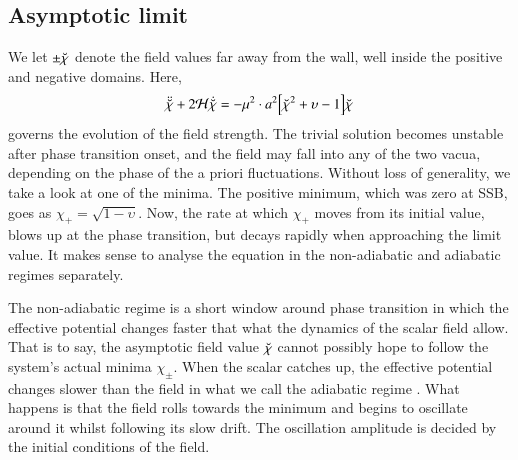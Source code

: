 \subsection{Asymptotic limit}\label{sec:PT:symm_dws:asymptotic}
    We let $\pm\breve{\chi}$ denote the field values far away from the wall, well inside the positive and negative domains. Here,
    \begin{equation}\label{eq:PT:symm_dws:eom_asym_chi_s}
        \ddot{\breve{\chi}} +  2\mathcal{H} \dot{\breve{\chi}} = - \mu^2 \cdot a^2{\left[  \breve{\chi}^2 + \upsilon - 1  \right]}\breve{\chi}
    \end{equation}
    governs the evolution of the field strength. The trivial solution becomes unstable after phase transition onset, and the field may fall into any of the two vacua, depending on the phase of the a priori fluctuations. Without loss of generality, we take a look at one of the minima. The positive minimum, which was zero at SSB, goes as $\chi_+ = \sqrt{1-\upsilon}$. Now, the rate at which $\chi_+$ moves from its initial value, blows up at the phase transition, but decays rapidly when approaching the limit value. %
    It makes sense to analyse the equation in the  non-adiabatic and  adiabatic regimes separately. %

    The non-adiabatic regime  is a short window around phase transition in which the effective potential changes faster that what the dynamics of the scalar field allow. That is to say, the asymptotic field value $\breve{\chi}$ cannot possibly hope to follow the system's actual minima $\chi_\pm$. When the scalar catches up, the effective potential changes slower than the field in what we call the  adiabatic regime . What happens is that the field rolls towards the minimum and begins to oscillate around it whilst following its slow drift. The oscillation amplitude is decided by the initial conditions of the field.




